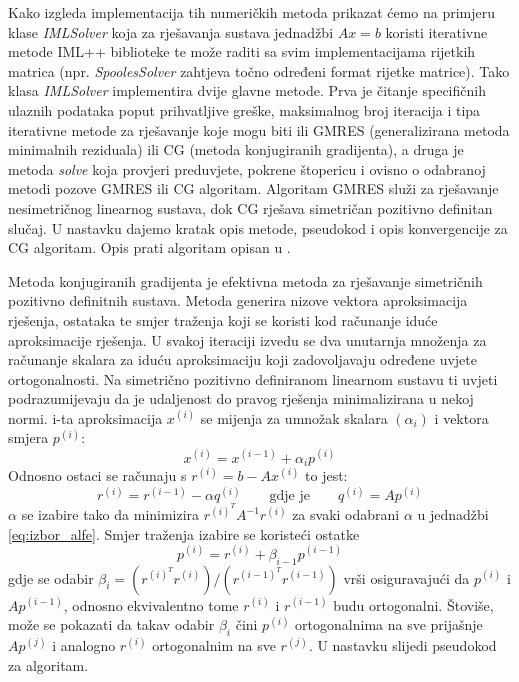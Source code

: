 \documentclass[a4paper,twoside,12pt]{memoir} %
\begin{document}
Kako izgleda implementacija tih numeričkih metoda prikazat ćemo na primjeru klase \textit{IMLSolver} koja za rješavanja sustava jednadžbi $A  x = b$ koristi iterativne metode IML++ biblioteke te može raditi sa svim implementacijama rijetkih matrica (npr. \textit{SpoolesSolver} zahtjeva točno određeni format rijetke matrice). Tako klasa \textit{IMLSolver} implementira dvije glavne metode. Prva je čitanje specifičnih ulaznih podataka poput prihvatljive greške, maksimalnog broj iteracija i tipa iterativne metode za rješavanje koje mogu biti ili GMRES (generalizirana metoda minimalnih reziduala) ili CG (metoda konjugiranih gradijenta), a druga je metoda \textit{solve} koja provjeri preduvjete, pokrene štopericu i ovisno o odabranoj metodi pozove GMRES ili CG algoritam. Algoritam GMRES služi za rješavanje nesimetričnog linearnog sustava, dok CG rješava simetričan pozitivno definitan slučaj. U nastavku dajemo kratak opis metode, pseudokod i opis konvergencije za CG algoritam. Opis prati algoritam opisan u \cite{linear_book}.  \par 
Metoda konjugiranih gradijenta je efektivna metoda za rješavanje simetričnih pozitivno definitnih sustava. Metoda generira nizove vektora aproksimacija rješenja, ostataka te smjer traženja koji se koristi kod računanje iduće aproksimacije rješenja. U svakoj iteraciji izvedu se dva unutarnja množenja za računanje skalara za iduću aproksimaciju koji zadovoljavaju određene uvjete ortogonalnosti. Na simetrično pozitivno definiranom linearnom sustavu ti uvjeti podrazumijevaju da je udaljenost do pravog rješenja minimalizirana u nekoj normi. i-ta aproksimacija $x^{(i)}$ se mijenja za umnožak skalara $(\alpha_i)$ i vektora smjera $p^(i)$:
\begin{equation}
x^{(i)} = x^{(i - 1)} + \alpha_i p^{(i)}    
\end{equation}
Odnosno ostaci se računaju s $r^{(i)} = b - Ax^{(i)}$ to jest:
\begin{equation}
\label{eq:izbor_alfe}
    r^{(i)} = r^{(i - 1)} - \alpha  q^{(i)} \qquad \text{gdje je} \qquad q^{(i)} = A p^{(i)} 
\end{equation}
$\alpha$ se izabire tako da minimizira $r^{(i)^T} A^{-1} r^{(i)}$ za svaki odabrani $\alpha$ u jednadžbi \ref{eq:izbor_alfe}. Smjer traženja izabire se koristeći ostatke
\begin{equation}
    p^{(i)} = r^{(i)} + \beta_{i-1} p^{(i-1)}
\end{equation}
gdje se odabir $\beta_i = (r^{(i)^T} r^{(i)}) / (r^{(i-1)^T} r^{(i-1)}) $ vrši osiguravajući da $p^{(i)}$ i $A p^{(i-1)}$, odnosno ekvivalentno tome $r^{(i)}$ i $r^{(i-1)}$ budu ortogonalni. Štoviše, može se pokazati da takav odabir $\beta_i$ čini $p^{(i)}$ ortogonalnima na sve prijašnje $A p^{(j)}$ i analogno $r^{(i)}$ ortogonalnim na sve $r^{(j)}$. U nastavku slijedi pseudokod za algoritam.
\end{document}

